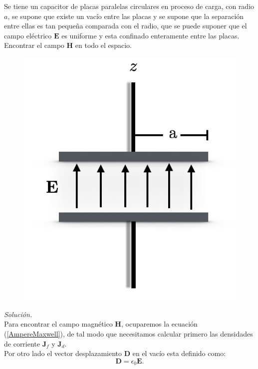 \documentclass[11pt,fleqn]{book} %
\begin{document}
\begin{example}
 Se tiene un capacitor de placas paralelas circulares en proceso de carga, con radio $a$, se supone que existe un vac\'io entre las placas y se supone que la separaci\'on entre ellas es tan pequeña comparada con el radio, que se puede suponer que el campo el\'ectrico $\textbf{E}$ es uniforme y esta confinado enteramente entre las placas. Encontrar el campo $\textbf{H}$ en todo el espacio.\\
\begin{figure}[hbtp]
\centering
\includegraphics[scale=0.25]{Pictures/condensadorcircular.png}
\caption{}
\end{figure}
\emph{Soluci\'on.}\\

Para encontrar el campo magn\'etico $\textbf{H}$, ocuparemos la ecuaci\'on (\ref{AmpereMaxwell}), de tal modo que necesitamos calcular primero las densidades de corriente $\textbf{J}_{f}$ y $\textbf{J}_{d}$.\\
Por otro lado el vector desplazamiento $\textbf{D}$ en el vac\'io esta definido como:\\
\begin{equation}
\textbf{D}=\epsilon_{0} \textbf{E}.
\end{equation}


\end{example}
\end{document}
